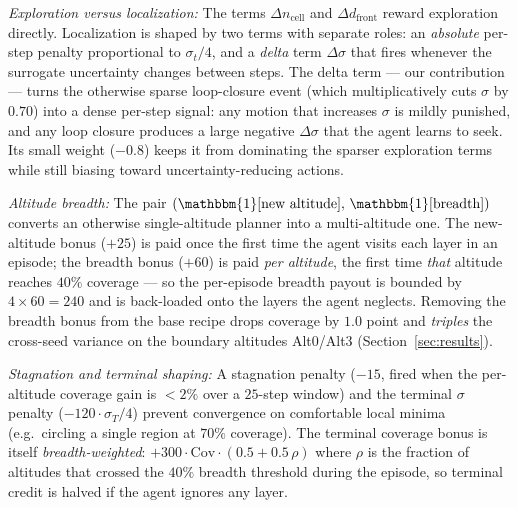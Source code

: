 \documentclass[conference]{IEEEtran}
\begin{document}
\emph{Exploration versus localization:} The terms $\Delta n_{\text{cell}}$ and $\Delta d_{\text{front}}$ reward exploration directly. Localization is shaped by two terms with separate roles: an \emph{absolute} per-step penalty proportional to $\sigma_t/4$, and a \emph{delta} term $\Delta\sigma$ that fires whenever the surrogate uncertainty changes between steps. The delta term --- our contribution --- turns the otherwise sparse loop-closure event (which multiplicatively cuts $\sigma$ by $0.70$) into a dense per-step signal: any motion that increases $\sigma$ is mildly punished, and any loop closure produces a large negative $\Delta\sigma$ that the agent learns to seek. Its small weight ($-0.8$) keeps it from dominating the sparser exploration terms while still biasing toward uncertainty-reducing actions.

\emph{Altitude breadth:} The pair $(\mathbbm{1}[\text{new altitude}],\,\mathbbm{1}[\text{breadth}])$ converts an otherwise single-altitude planner into a multi-altitude one. The new-altitude bonus ($+25$) is paid once the first time the agent visits each layer in an episode; the breadth bonus ($+60$) is paid \emph{per altitude}, the first time \emph{that} altitude reaches $40\%$ coverage --- so the per-episode breadth payout is bounded by $4\!\times\!60\!=\!240$ and is back-loaded onto the layers the agent neglects. Removing the breadth bonus from the base recipe drops coverage by $1.0$ point and \emph{triples} the cross-seed variance on the boundary altitudes Alt0/Alt3 (Section~\ref{sec:results}).

\emph{Stagnation and terminal shaping:} A stagnation penalty ($-15$, fired when the per-altitude coverage gain is $<\!2\%$ over a $25$-step window) and the terminal $\sigma$ penalty ($-120\!\cdot\!\sigma_T/4$) prevent convergence on comfortable local minima (e.g.\ circling a single region at $70\%$ coverage). The terminal coverage bonus is itself \emph{breadth-weighted}: $+300\!\cdot\!\mathrm{Cov}\!\cdot\!(0.5+0.5\,\rho)$ where $\rho$ is the fraction of altitudes that crossed the $40\%$ breadth threshold during the episode, so terminal credit is halved if the agent ignores any layer.
\end{document}
